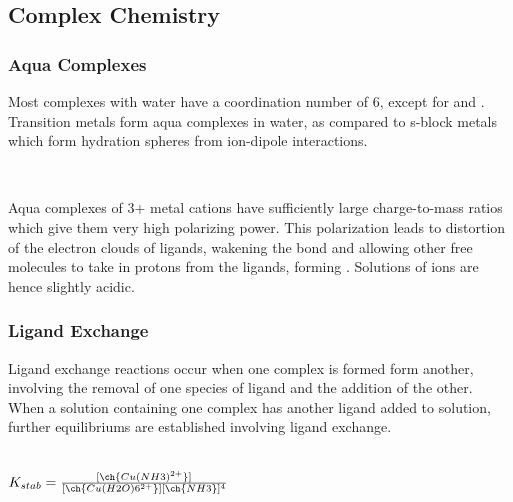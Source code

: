 \documentclass[../main]{subfiles}
\begin{document}
	\subsection{Complex Chemistry}

	\subsubsection{Aqua Complexes}


	Most complexes with water have a coordination number of 6, except for  and . \\

	Transition metals form aqua complexes in water, as compared to s-block metals which form hydration spheres from ion-dipole interactions. \\

	\begin{center}
		 \\
	\end{center}

	Aqua complexes of 3+ metal cations have sufficiently large charge-to-mass ratios which give them very high polarizing power. This polarization leads to distortion of the electron clouds of  ligands, wakening the  bond and allowing other free  molecules to take in protons from the ligands, forming . Solutions of  ions are hence slightly acidic.

	\subsubsection{Ligand Exchange} 

	Ligand exchange reactions occur when one complex is formed form another, involving the removal of one species of ligand and the addition of the other. When a solution containing one complex has another ligand added to solution, further equilibriums are established involving ligand exchange.

	\begin{center}
		 \\
		\(K_{stab} = \frac{[\ch{Cu(NH3)^{2+}}]}{[\ch{Cu(H2O)6^{2+}}][\ch{NH3}]^4}\)
	\end{center}

\end{document}
